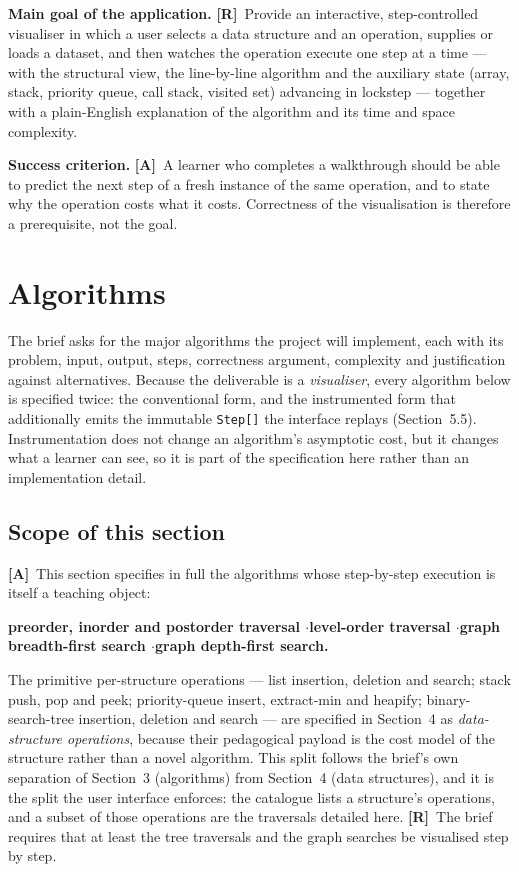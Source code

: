 \documentclass[11pt,a4paper]{article}
\newcommand{\R}{\textcolor{reqc}{\textbf{[R]}}}     %
\newcommand{\A}{\textcolor{asmc}{\textbf{[A]}}}     %
\newcommand{\ct}[1]{\texttt{#1}}
\begin{document}
\medskip
\noindent\textbf{Main goal of the application.} \R\ Provide an interactive, step-controlled
visualiser in which a user selects a data structure and an operation, supplies or loads a
dataset, and then watches the operation execute one step at a time --- with the structural
view, the line-by-line algorithm and the auxiliary state (array, stack, priority queue, call
stack, visited set) advancing in lockstep --- together with a plain-English explanation of the
algorithm and its time and space complexity.

\medskip
\noindent\textbf{Success criterion.} \A\ A learner who completes a walkthrough should be able to
predict the next step of a fresh instance of the same operation, and to state why the operation
costs what it costs. Correctness of the visualisation is therefore a prerequisite, not the goal.

\section{Algorithms}

The brief asks for the major algorithms the project will implement, each with its problem,
input, output, steps, correctness argument, complexity and justification against alternatives.
Because the deliverable is a \emph{visualiser}, every algorithm below is specified twice: the
conventional form, and the instrumented form that additionally emits the immutable
\ct{Step[]} the interface replays (Section~5.5). Instrumentation does not change an algorithm's
asymptotic cost, but it changes what a learner can see, so it is part of the specification here
rather than an implementation detail.

\subsection*{Scope of this section}

\noindent\A\ This section specifies in full the algorithms whose step-by-step execution is itself a
teaching object:

\begin{center}
\textbf{preorder, inorder and postorder traversal \quad$\cdot$\quad level-order traversal
\quad$\cdot$\quad graph breadth-first search \quad$\cdot$\quad graph depth-first search.}
\end{center}

\noindent The primitive per-structure operations --- list insertion, deletion and search; stack
push, pop and peek; priority-queue insert, extract-min and heapify; binary-search-tree insertion,
deletion and search --- are specified in Section~4 as \emph{data-structure operations}, because
their pedagogical payload is the cost model of the structure rather than a novel algorithm. This
split follows the brief's own separation of Section~3 (algorithms) from Section~4 (data
structures), and it is the split the user interface enforces: the catalogue lists a structure's
operations, and a subset of those operations are the traversals detailed here. \R\ The brief
requires that at least the tree traversals and the graph searches be visualised step by step.
\end{document}
